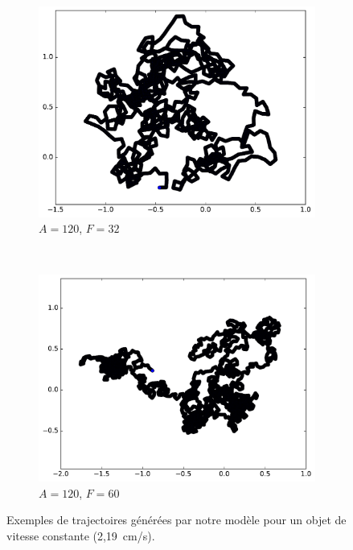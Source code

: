 \begin{figure}[htb]
\begin{subfigure}[t]{\subImgWmo}
			\includegraphics[width=\textwidth]{figures/ch3/synTraj_219_120_32}
			\caption[$A = 120$, $F=32$]{$A = 120$, $F=32$}
			\label{fig:synTraj_219_120_32}
		\end{subfigure}
		~
		\begin{subfigure}[t]{\subImgWmo}
			\centering
			\includegraphics[width=\textwidth]{figures/ch3/synTraj_219_120_60}
			\caption[$A = 120$, $F=60$]{$A = 120$, $F=60$}
			\label{fig:synTraj_219_120_60}
		\end{subfigure}
		\caption[Mouvements générés par notre modèle -- IV]{Exemples de trajectoires générées par notre modèle pour un objet de vitesse constante (2,19~cm/s).}
		\label{fig:motion105120}
	\end{figure}
	
